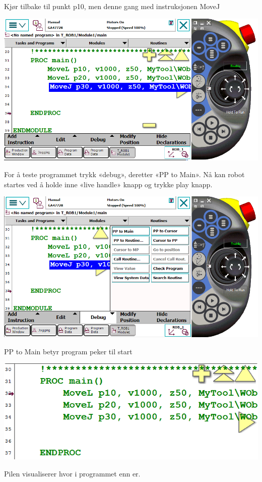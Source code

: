 Kjør tilbake til punkt p10, men denne gang med instruksjonen MoveJ

\includegraphics[width=1\textwidth]{i04861x26}

For å teste programmet trykk «debug», deretter «PP to Main». Nå kan
robot startes ved å holde inne «live handle» knapp og trykke play
knapp.

\includegraphics[width=1\textwidth]{i04861x27}

PP to Main betyr program peker til start

\includegraphics[width=1\textwidth]{i04861x28}

Pilen visualiserer hvor i programmet enn er.


